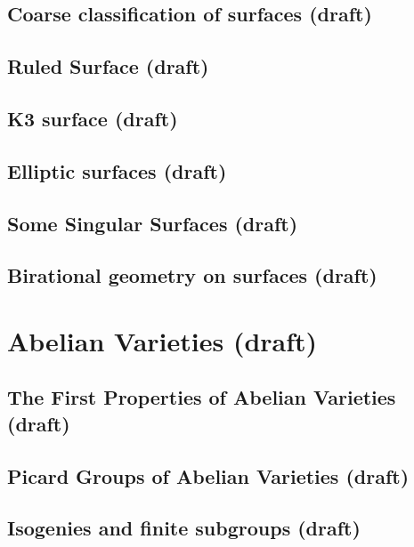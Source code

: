 \documentclass[sectionlevel=book]{noteformyself}
\begin{document}
        \section{Coarse classification of surfaces (draft)}
        
        \section{Ruled Surface (draft)}
        
        \section{K3 surface (draft)}
        
        \section{Elliptic surfaces (draft)}
        
        \section{Some Singular Surfaces (draft)}
        
        \section{Birational geometry on surfaces (draft)}
        

    \chapter{Abelian Varieties (draft)}
        \section{The First Properties of Abelian Varieties (draft)}
        
        \section{Picard Groups of Abelian Varieties (draft)}
        
        \section{Isogenies and finite subgroups (draft)}
        
\end{document}
